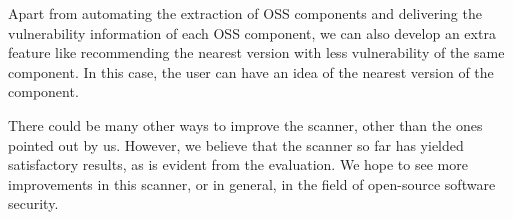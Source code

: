 Apart from automating the extraction of \acs{OSS} components and delivering the vulnerability information of each \acs{OSS} component, we can also develop an extra feature like recommending the nearest version with less vulnerability of the same component. In this case, the user can have an idea of the nearest version of the component.

There could be many other ways to improve the scanner, other than the ones pointed out by us. However, we believe that the scanner so far has yielded satisfactory results, as is evident from the evaluation. We hope to see more improvements in this scanner, or in general, in the field of open-source software security.
%